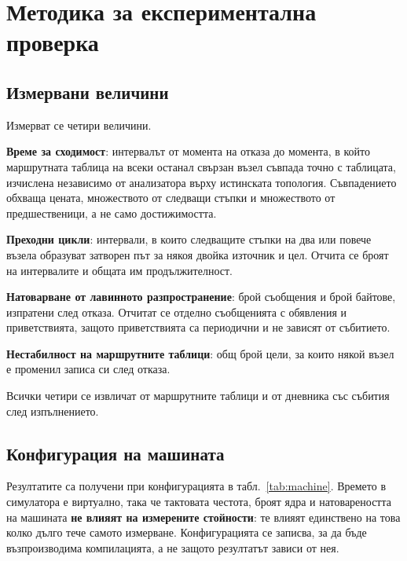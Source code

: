 \section{Методика за експериментална проверка}
\label{sec:method}

\subsection{Измервани величини}

Измерват се четири величини.

\textbf{Време за сходимост}: интервалът от момента на отказа до момента, в който
маршрутната таблица на всеки останал свързан възел съвпада точно с таблицата, изчислена
независимо от анализатора върху истинската топология. Съвпадението обхваща цената,
множеството от следващи стъпки и множеството от предшественици, а не само достижимостта.

\textbf{Преходни цикли}: интервали, в които следващите стъпки на два или повече възела
образуват затворен път за някоя двойка източник и цел. Отчита се броят на интервалите и
общата им продължителност.

\textbf{Натоварване от лавинното разпространение}: брой съобщения и брой байтове,
изпратени след отказа. Отчитат се отделно съобщенията с обявления и приветствията, защото
приветствията са периодични и не зависят от събитието.

\textbf{Нестабилност на маршрутните таблици}: общ брой цели, за които някой възел е
променил записа си след отказа.

Всички четири се извличат от маршрутните таблици и от дневника със събития след
изпълнението.

\subsection{Конфигурация на машината}

Резултатите са получени при конфигурацията в табл.~\ref{tab:machine}. Времето в
симулатора е виртуално, така че тактовата честота, броят ядра и натовареността на машината
\textbf{не влияят на измерените стойности}: те влияят единствено на това колко дълго тече
самото измерване. Конфигурацията се записва, за да бъде възпроизводима компилацията, а не
защото резултатът зависи от нея.

